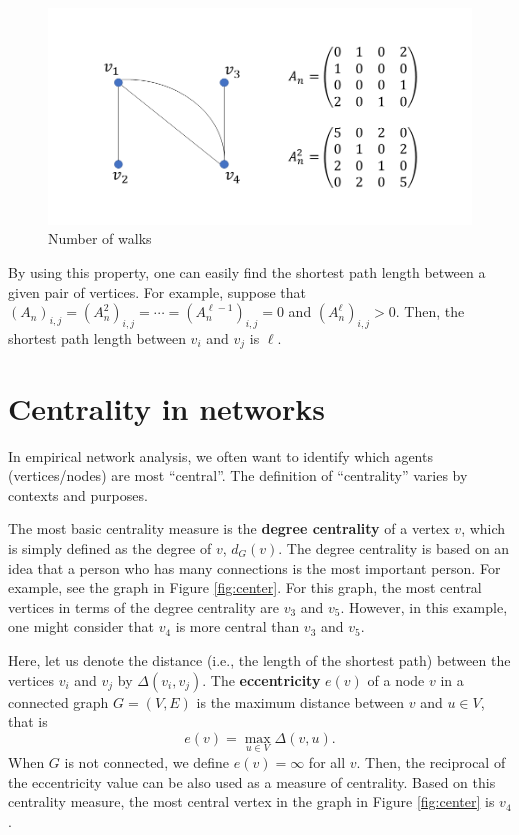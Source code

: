 \documentclass[10.5pt, A4paper, openany, uplatex]{book}
\numberwithin{equation}{section}
\begin{document}
\begin{appendices}
\begin{enumerate}
		\begin{figure}[h!]
			\begin{center}
				\includegraphics[width = 12cm]{nwalks.png}
				\caption{Number of walks\label{fig:nwalks}}
			\end{center}
		\end{figure}
	
		By using this property, one can easily find the shortest path length between a given pair of vertices.
		For example, suppose that $ (A_n)_{i,j} =  (A_n^2)_{i,j} = \cdots =  (A_n^{\ell - 1})_{i,j} = 0$ and $(A_n^\ell)_{i,j} > 0$. 
		Then, the shortest path length between $v_i$ and $v_j$ is $\ell$.
	\end{enumerate}
	
	\section{Centrality in networks}
	In empirical network analysis, we often want to identify which agents (vertices/nodes) are most ``central''.
	The definition of ``centrality'' varies by contexts and purposes.
	
	The most basic centrality measure is the \textbf{degree centrality} of a vertex $v$, which is simply defined as the degree of $v$, $d_G(v)$.
	The degree centrality is based on an idea that a person who has many connections is the most important person.
	For example, see the graph in Figure \ref{fig:center}.
	For this graph, the most central vertices in terms of the degree centrality are $v_3$ and $v_5$.
	However, in this example, one might consider that $v_4$ is more central than $v_3$ and $v_5$.
	
	Here, let us denote the distance (i.e., the length of the shortest path) between the vertices $v_i$ and $v_j$ by $\Delta(v_i, v_j)$.
	The \textbf{eccentricity} $e(v)$ of a node $v$ in a connected graph $G = (V, E)$ is the maximum distance between $v$ and $u \in V$, that is
	\[
		e(v) = \max_{u \in V} \Delta(v, u).
	\]
	When $G$ is not connected, we define $e(v) = \infty$ for all $v$.
	Then, the reciprocal of the eccentricity value can be also used as a measure of centrality.
	Based on this centrality measure, the most central vertex in the graph in Figure \ref{fig:center} is $v_4$.
	

\end{appendices}
\end{document}
